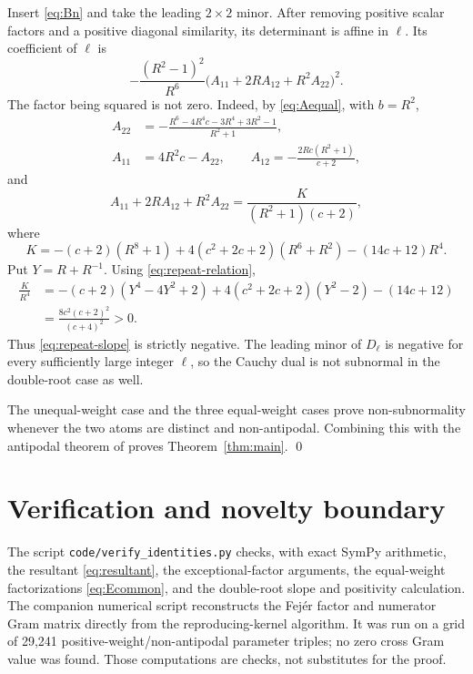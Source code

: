 \documentclass[11pt]{article}
\begin{document}
Insert \eqref{eq:Bn} and take the leading $2\times2$ minor.  After
removing positive scalar factors and a positive diagonal similarity, its
determinant is affine in $\ell$.  Its coefficient of $\ell$ is
\begin{equation}\label{eq:repeat-slope}
 -\frac{(R^2-1)^2}{R^6}
 \bigl(A_{11}+2RA_{12}+R^2A_{22}\bigr)^2.
\end{equation}
The factor being squared is not zero.  Indeed, by \eqref{eq:Aequal},
with $b=R^2$,
\begin{align*}
 A_{22}&=-\frac{R^6-4R^4c-3R^4+3R^2-1}{R^2+1},\\
 A_{11}&=4R^2c-A_{22},\qquad
 A_{12}=-\frac{2Rc(R^2+1)}{c+2},
\end{align*}
and
\begin{equation}\label{eq:J-K}
 A_{11}+2RA_{12}+R^2A_{22}
 =\frac{K}{(R^2+1)(c+2)},
\end{equation}
where
\[
 K=-(c+2)(R^8+1)+4(c^2+2c+2)(R^6+R^2)-(14c+12)R^4.
\]
Put $Y=R+R^{-1}$.  Using \eqref{eq:repeat-relation},
\begin{align*}
 \frac K{R^4}
 &=-(c+2)(Y^4-4Y^2+2)
   +4(c^2+2c+2)(Y^2-2)-(14c+12)\\
 &=\frac{8c^2(c+2)^2}{(c+4)^2}>0.
\end{align*}
Thus \eqref{eq:repeat-slope} is strictly negative.  The leading minor of
$D_\ell$ is negative for every sufficiently large integer $\ell$, so the
Cauchy dual is not subnormal in the double-root case as well.

The unequal-weight case and the three equal-weight cases prove
non-subnormality whenever the two atoms are distinct and non-antipodal.
Combining this with the antipodal theorem of \cite{CGR} proves
Theorem~\ref{thm:main}. \qed

\section{Verification and novelty boundary}

The script \texttt{code/verify\_identities.py} checks, with exact SymPy
arithmetic, the resultant \eqref{eq:resultant}, the exceptional-factor
arguments, the equal-weight factorizations \eqref{eq:Ecommon}, and the
double-root slope and positivity calculation.  The companion numerical
script reconstructs the Fej\'er factor and numerator Gram matrix directly
from the reproducing-kernel algorithm.  It was run on a grid of 29,241
positive-weight/non-antipodal parameter triples; no zero cross Gram value
was found.  Those computations are checks, not substitutes for the proof.
\end{document}
